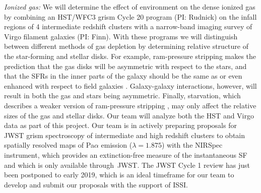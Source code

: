 \documentclass[11pt]{article}
\begin{document}

\textit{Ionized gas:} We will determine the effect of environment on the dense ionized
gas by combining an HST/WFC3 grism Cycle 20 program
(PI: Rudnick) on the infall regions of 4 intermediate redshift
clusters with a narrow-band imaging survey of Virgo filament galaxies (PI: Finn).  With these programs
we will distinguish between different methods of gas depletion by
determining relative structure of the star-forming and stellar disks.
For example, ram-pressure stripping makes the prediction that the gas
disks will be asymmetric \citep[e.g.][]{Quilis00,Crowl05} with respect
to the stars, and that the SFRs in the inner parts of the galaxy should
be the same as or even enhanced with respect to field galaxies
\citep{Koopmann04,Weinmann10,Poggianti17a}.  Galaxy-galaxy interactions, however,
will result in both the gas and stars being asymmetric.  Finally,
starvation, which describes a weaker version of ram-pressure stripping
\citep[e.g.][]{Larson80}, may only affect the relative sizes of the
gas and stellar disks. Our team will analyze both the HST and Virgo data as part of this project.   Our team is in actively preparing proposals for JWST grism spectroscopy of intermediate and high redshift clusters to obtain spatially resolved maps of Pa$\alpha$ emission ($\lambda=1.875$\micron) with the  NIRSpec instrument, which provides an extinction-free measure of the instantaneous SF and which is only available through~JWST.  The JWST Cycle 1 review has just been postponed to early 2019, which is an ideal timeframe for our team to develop and submit our proposals with the support of ISSI.
\end{document}
